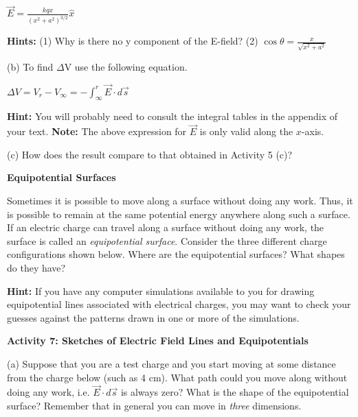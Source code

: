 {\centering \( \overrightarrow{E}=\frac{kqx}{(x^{2}+a^{2})^{3/2}}\hat{x} \)\par}

\textbf{Hints:} (1) Why is there no y component of the E-field? (2)
\( \cos \theta =\frac{x}{\sqrt{x^{2}+a^{2}}} \)
\answerspace{30mm}

(b) To find \( \Delta  \)V use the following equation.

{\centering \( \Delta V=V_{r}-V_{\infty }=-\int ^{r}_{\infty }\overrightarrow{E}\cdot d\overrightarrow{s} \)\par}
\textbf{Hint:} You will probably need to consult the integral tables in the appendix of your text.
\textbf{Note:} The above expression for $\overrightarrow{E}$ is only valid along the $x$-axis.
\answerspace{30mm}

(c) How does the result compare to that obtained in Activity 5 (c)?
\answerspace{10mm}

\pagebreak[2]
\textbf{Equipotential Surfaces}

Sometimes it is possible to move along a surface without doing any
work. Thus, it is possible to remain at the same potential energy
anywhere along such a surface. If an electric charge can travel along
a surface without doing any work, the surface is called an \emph{equipotential
surface}.
Consider the three different charge configurations shown below. Where
are the equipotential surfaces? What shapes do they have?

\textbf{Hint:} If you have any computer simulations available to you
for drawing equipotential lines associated with electrical charges,
you may want to check your guesses against the patterns drawn in one
or more of the simulations.

\textbf{Activity 7: Sketches of Electric Field Lines and Equipotentials}

(a) Suppose that you are a test charge and you start moving at some
distance from the charge below (such as 4 cm). What path could you
move along without doing any work, i.e. \( \overrightarrow{E}\cdot d\overrightarrow{s} \)
is always zero? What is the shape of the equipotential surface? Remember
that in general you can move in \emph{three} dimensions.

